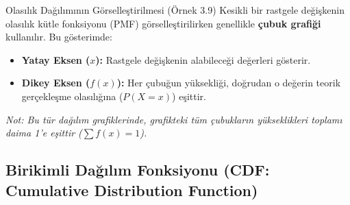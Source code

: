 ﻿\documentclass[light]{lutbeamer}
\begin{document}
\begin{frame}{Olasılık Dağılımının Görselleştirilmesi (Örnek 3.9)}
    Kesikli bir rastgele değişkenin olasılık kütle fonksiyonu (PMF) görselleştirilirken genellikle \textbf{çubuk grafiği} kullanılır. Bu gösterimde:
    
    \begin{itemize}
        \item \textbf{Yatay Eksen ($x$):} Rastgele değişkenin alabileceği değerleri gösterir.
        \item \textbf{Dikey Eksen ($f(x)$):} Her çubuğun yüksekliği, doğrudan o değerin teorik gerçekleşme olasılığına ($P(X=x)$) eşittir.
    \end{itemize}

    \begin{center}
    \end{center}
    
    \vspace{-0.4cm}
    \begin{center}
        \scriptsize \textit{Not: Bu tür dağılım grafiklerinde, grafikteki tüm çubukların yükseklikleri toplamı daima 1'e eşittir ($\sum f(x) = 1$).}
    \end{center}
\end{frame}



\subsection{Birikimli Dağılım Fonksiyonu (CDF: Cumulative Distribution Function)}
\end{document}
